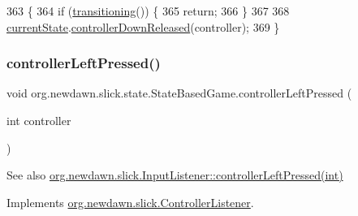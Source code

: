 \begin{DoxyCode}
363                                                        \{
364         \textcolor{keywordflow}{if} (\mbox{\hyperlink{classorg_1_1newdawn_1_1slick_1_1state_1_1_state_based_game_ae869c08778875776081935a090d4c92f}{transitioning}}()) \{
365             \textcolor{keywordflow}{return};
366         \}
367         
368         \mbox{\hyperlink{classorg_1_1newdawn_1_1slick_1_1state_1_1_state_based_game_a6a45e68094bb9b7ec30b8a8b7d415766}{currentState}}.\mbox{\hyperlink{interfaceorg_1_1newdawn_1_1slick_1_1_controller_listener_a7d0ca99c8cd5b0d332bece1d17befee7}{controllerDownReleased}}(controller);
369     \}
\end{DoxyCode}
\mbox{\label{classorg_1_1newdawn_1_1slick_1_1state_1_1_state_based_game_a9bba4427977b841b78d8706910f0a8e7}} 
\subsubsection{\texorpdfstring{controller\+Left\+Pressed()}{controllerLeftPressed()}}
{\footnotesize\ttfamily void org.\+newdawn.\+slick.\+state.\+State\+Based\+Game.\+controller\+Left\+Pressed (\begin{DoxyParamCaption}\item[{int}]{controller }\end{DoxyParamCaption})\hspace{0.3cm}{\ttfamily [inline]}}

\begin{DoxySeeAlso}{See also}
\mbox{\hyperlink{interfaceorg_1_1newdawn_1_1slick_1_1_controller_listener_abfb38c5d8e44b7613a49cbfaf19d5585}{org.\+newdawn.\+slick.\+Input\+Listener\+::controller\+Left\+Pressed(int)}} 
\end{DoxySeeAlso}


Implements \mbox{\hyperlink{interfaceorg_1_1newdawn_1_1slick_1_1_controller_listener_abfb38c5d8e44b7613a49cbfaf19d5585}{org.\+newdawn.\+slick.\+Controller\+Listener}}.


